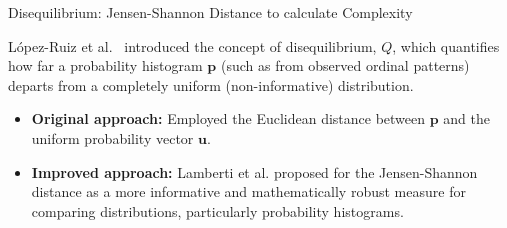 \documentclass{beamer}
\begin{document}


	

\begin{frame}{Disequilibrium: Jensen-Shannon Distance to calculate Complexity}
	
	López-Ruiz et al.~\cite{lopez1995statistical} introduced the concept of \alert{disequilibrium, $Q$}, which quantifies how far a probability histogram $\mathbf{p}$ (such as from observed ordinal patterns) departs from a completely uniform (non-informative) distribution.
	
	\begin{itemize}
		\item \textbf{Original approach:} Employed the \alert{Euclidean distance} between $\mathbf{p}$ and the uniform probability vector $\mathbf{u}$.
		\item \textbf{Improved approach:} Lamberti et al.\cite{lamberti2004intensive} proposed for the \alert{Jensen-Shannon distance} as a more informative and mathematically robust measure for comparing distributions, particularly probability histograms.
	\end{itemize}
\end{frame}	
\end{document}
